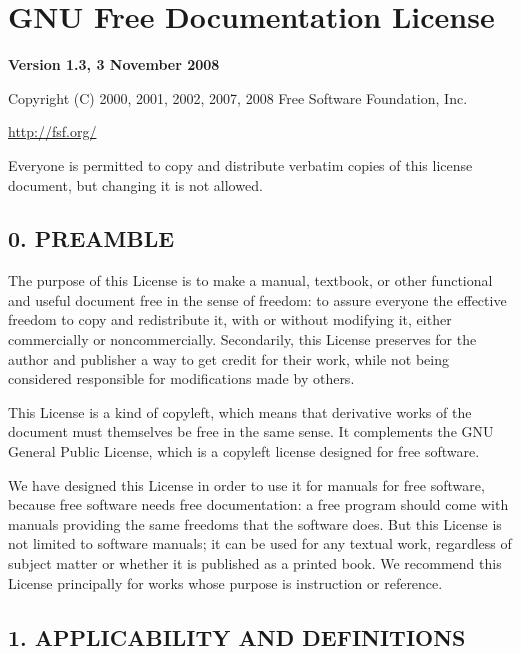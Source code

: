 \documentclass[captions=tableheading]{scrbook}
\begin{document}
\vfill{}
\chapter{GNU Free Documentation License}
\label{sec-18}

\label{cha:GNU-Free-Documentation}

\begin{center}
\textbf{\large Version 1.3, 3 November 2008}\bigskip{}

\par\end{center}

\noindent Copyright (C) 2000, 2001, 2002, 2007, 2008 Free Software
Foundation, Inc.

\begin{center}
\url{http://fsf.org/}
\par\end{center}

\noindent Everyone is permitted to copy and distribute verbatim copies of this license document, but changing it is not allowed.
\section{0. PREAMBLE}
\label{sec-18-1}


The purpose of this License is to make a manual, textbook, or other functional and useful document free  in the sense of freedom: to assure everyone the effective freedom to copy and redistribute it, with or without modifying it, either commercially or noncommercially. Secondarily, this License preserves for the author and publisher a way to get credit for their work, while not being considered responsible for modifications made by others.

This License is a kind of copyleft, which means that derivative works of the document must themselves be free in the same sense. It complements the GNU General Public License, which is a copyleft license designed for free software.

We have designed this License in order to use it for manuals for free software, because free software needs free documentation: a free program should come with manuals providing the same freedoms that the software does. But this License is not limited to software manuals; it can be used for any textual work, regardless of subject matter or whether it is published as a printed book. We recommend this License principally for works whose purpose is instruction or reference.
\section{1. APPLICABILITY AND DEFINITIONS}
\label{sec-18-2}
\end{document}
